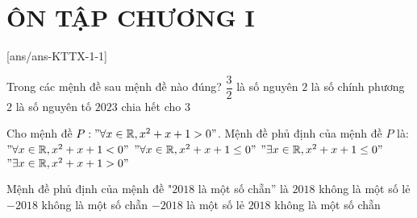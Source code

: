 ﻿\section*{ÔN TẬP CHƯƠNG I}
\setcounter{ex}{0}\setcounter{bt}{0}
[ans/ans-KTTX-1-1]
\begin{ex}%
Trong các mệnh đề sau mệnh đề nào đúng?
\choice
{ $\dfrac{3}{2}$ là số nguyên}
{ $2$ là số chính phương}
{\True $2$ là số nguyên tố}
{ $2023$ chia hết cho $3$}
\end{ex}

\begin{ex}%
Cho mệnh đề $P:"\forall x\in \mathbb{R},x^2+x+1>0"$. Mệnh đề phủ định của mệnh đề $P$ là:
\choice
{ $"\forall x\in \mathbb{R},x^2+x+1<0"$}
{ $"\forall x\in \mathbb{R},x^2+x+1\le 0"$}
{\True $"\exists x\in \mathbb{R},x^2+x+1\le 0"$}
{ $"\exists x\in \mathbb{R},x^2+x+1>0"$}
\end{ex}

\begin{ex}%
Mệnh đề phủ định của mệnh đề "$2018$ là một số chẵn'' là
\choice
{$2018$ không là một số lẻ}
{$-2018$ không là một số chẵn}
{$-2018$ là một số lẻ}
{\True $2018$ không là một số chẵn}
\end{ex}

